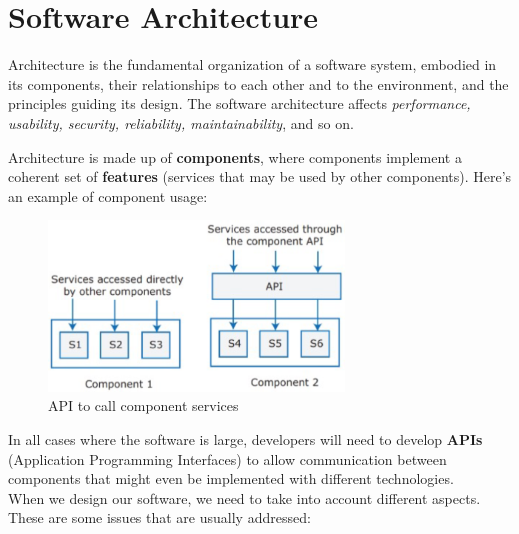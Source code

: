 \chapter{Software Architecture}

Architecture is the fundamental organization of a software system, embodied in its components, their relationships to each other and to the environment, and the principles guiding its design. The software architecture affects \emph{performance, usability, security, reliability, maintainability}, and so on.

Architecture is made up of \textbf{components}, where components implement a coherent set of \textbf{features} (services that may be used by other components). Here's an example of component usage:

\begin{figure} [H]
    \centering
    \includegraphics[width=0.7\textwidth]{images/SoftwareArchitecture/componentAPI.png}
    \caption{API to call component services}
    \label{fig:componentAPI}
\end{figure} 

In all cases where the software is large, developers will need to develop \textbf{APIs} (Application Programming Interfaces) to allow communication between components that might even be implemented with different technologies. \\

When we design our software, we need to take into account different aspects. These are some issues that are usually addressed:

